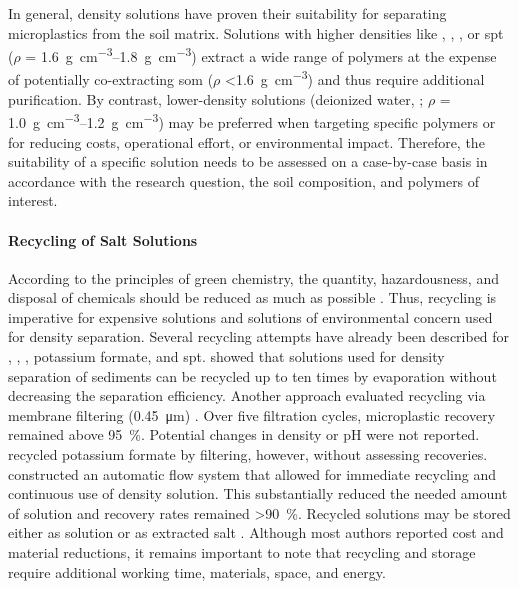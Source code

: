 In general, density solutions have proven their suitability for separating microplastics from the soil matrix. Solutions with higher densities like , , , or \ac{spt} ($\rho$ =
\SIrange{1.6}{1.8}{\gram\per\cubic\centi\meter}) extract a wide range of polymers at the expense of potentially co-extracting \ac{som} ($\rho$
\SI{<1.6}{\gram\per\cubic\centi\meter}) \citep{CerliSeparation2012} and thus require additional purification. By contrast, lower-density solutions (deionized water, ; $\rho$ = \SIrange{1.0}{1.2}{\gram\per\cubic\centi\meter}) may be preferred when targeting specific polymers or for reducing costs, operational effort, or environmental impact. Therefore, the suitability of a specific solution needs to be assessed on a case-by-case basis in accordance with the research question, the soil composition, and polymers of interest.

\paragraph{Recycling of Salt Solutions}

According to the principles of green chemistry, the quantity,
hazardousness, and disposal of chemicals should be reduced as much as possible \citep{AnastasGreen2009}. Thus, recycling is imperative
for expensive solutions and solutions of environmental concern used for density separation. Several recycling attempts have already been described for , , , potassium formate, and \ac{spt}.  showed that  solutions used for density separation of sediments can be recycled up to ten times by evaporation without decreasing the separation efficiency. Another approach evaluated  recycling via membrane filtering (\SI{0.45}{\micro\meter}) \citep{RodriguesImproving2020}. Over five filtration cycles,
microplastic recovery remained above \SI{95}{\percent}. Potential changes in density or pH were not reported.  recycled potassium formate by filtering, however, without assessing recoveries.  constructed an automatic flow system that allowed for immediate recycling and continuous use of density solution.
This substantially reduced the needed amount of  solution and recovery rates remained \SI{>90}{\percent}. Recycled solutions may be stored either as solution \citep{LiuMethod2019,RodriguesImproving2020} or as extracted salt \citep{KedzierskiEfficient2017}. Although most authors reported cost and material reductions, it remains important to note that recycling and storage require additional working time, materials, space, and energy.

